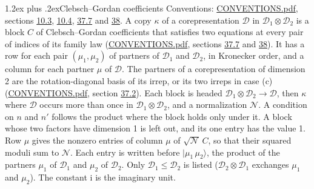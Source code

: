 \documentclass[10pt,a4paper]{article}
\makeatletter
\renewcommand\section{\@startsection{section}{1}{\z@}{-3ex plus -1ex minus -.2ex}%
  {1.2ex plus .2ex}{\normalfont\large\sffamily\bfseries\color{parttitle}}}
\numberwithin{equation}{section}
\newcommand{\iunit}{\mathrm{i}}
\newcommand{\irrprod}{\otimes}
\newcommand{\mult}{\kappa}
\newcommand{\intx}{\mu}
\newcommand{\cgnorm}{\mathcal{N}}
\newcommand{\prodket}[2]{\lvert {#1}\,{#2}\rangle}
\makeatother
\begin{document}
\section{Clebsch--Gordan coefficients}\label{s:clebsch_gordan}
Conventions: \href{../../CONVENTIONS.pdf}{CONVENTIONS.pdf}, sections \href{../../../rotation/CONVENTIONS.pdf\#conv.10.3}{10.3}, \href{../../../rotation/CONVENTIONS.pdf\#conv.10.4}{10.4}, \href{../../CONVENTIONS.pdf\#conv.37.7}{37.7} and \href{../../CONVENTIONS.pdf\#conv.38}{38}.
\leavevmode\label{n:matrix.corep.factors}\label{n:index.copy}\label{n:matrix.cg.stored}A copy $\mult$ of a corepresentation $\mathcal{D}$ in $\mathcal{D}_1\irrprod\mathcal{D}_2$ is a block $C$ of Clebsch--Gordan coefficients that satisfies two equations at every pair of indices of its family law (\href{../../CONVENTIONS.pdf}{CONVENTIONS.pdf}, sections \href{../../CONVENTIONS.pdf\#conv.37.7}{37.7} and \href{../../CONVENTIONS.pdf\#conv.38}{38}). \label{n:index.cg}It has a row for each pair $(\intx_1, \intx_2)$ of partners of $\mathcal{D}_1$ and $\mathcal{D}_2$, in Kronecker order, and a column for each partner $\intx$ of $\mathcal{D}$.
The partners of a corepresentation of dimension 2 are the rotation-diagonal basis of its irrep, or its two irreps in case (c) (\href{../../CONVENTIONS.pdf}{CONVENTIONS.pdf}, section \href{../../CONVENTIONS.pdf\#conv.37.2}{37.2}).
Each block is headed $\mathcal{D}_1\irrprod\mathcal{D}_2\to\mathcal{D}$, then $\mult$ where $\mathcal{D}$ occurs more than once in $\mathcal{D}_1\irrprod\mathcal{D}_2$, and a normalization $\cgnorm$. A condition on $n$ and $n'$ follows the product where the block holds only under it. A block whose two factors have dimension 1 is left out, and its one entry has the value 1. Row $\intx$ gives the nonzero entries of column $\intx$ of $\sqrt{\cgnorm}\,C$, so that their squared moduli sum to $\cgnorm$. \label{n:vector.ket.product}Each entry is written before $\prodket{\intx_1}{\intx_2}$, the product of the partners $\intx_1$ of $\mathcal{D}_1$ and $\intx_2$ of $\mathcal{D}_2$. Only $\mathcal{D}_1 \le \mathcal{D}_2$ is listed ($\mathcal{D}_2\irrprod\mathcal{D}_1$ exchanges $\intx_1$ and $\intx_2$).
The constant $\iunit$ is the imaginary unit.
\end{document}
